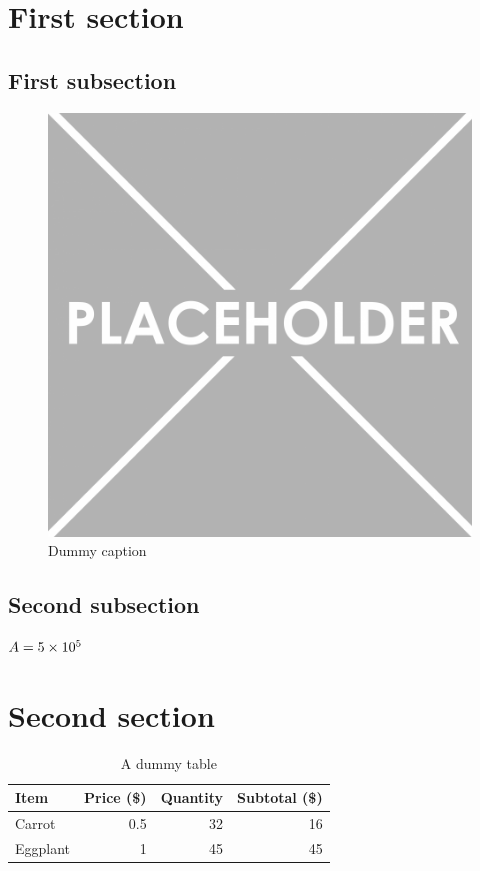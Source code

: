 \documentclass[11pt]{article}
\begin{document}
\makeReportFirstPage

\makeTOC

\section{First section}

\subsection{First subsection}

\lipsum[1]

\begin{figure}[!htbp]
\centering
\includegraphics[scale=0.1]{placeholder.png}
\caption{Dummy caption}
\label{fig:dummy-caption}
\end{figure}

\subsection{Second subsection}
\lipsum[2]

$A = \num{5e5}$

\section{Second section}
\lipsum[3]


\begin{table}[!htbp]
\centering
\begin{tabular}{lrrr}
\toprule
Item & Price (\$) & Quantity & Subtotal (\$) \\
\midrule
Carrot & 0.5 & 32 & 16 \\
Eggplant & 1 & 45 & 45 \\
\bottomrule
\end{tabular}
\caption{A dummy table}
\label{tab:courses}
\end{table}

\makeLOFT
\end{document}
